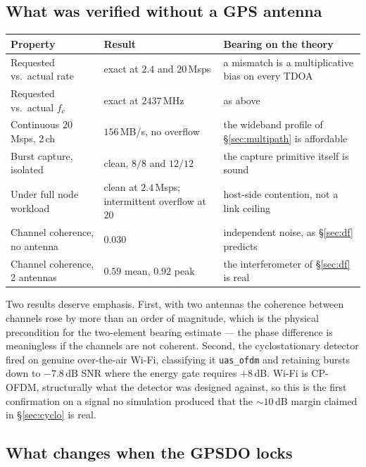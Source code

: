 \documentclass[11pt,a4paper]{article}
\newcommand{\code}[1]{\texttt{\small #1}}
\begin{document}
\subsection{What was verified without a GPS antenna}

\begin{center}
\small
\begin{tabular}{@{}lll@{}}
\toprule
\textbf{Property} & \textbf{Result} & \textbf{Bearing on the theory} \\
\midrule
Requested vs.\ actual rate & exact at $2.4$ and $20$\,Msps &
  a mismatch is a multiplicative bias on every TDOA \\
Requested vs.\ actual $f_c$ & exact at $2437$\,MHz & as above \\
Continuous $20$\,Msps, 2\,ch & $156$\,MB/s, no overflow &
  the wideband profile of \S\ref{sec:multipath} is affordable \\
Burst capture, isolated & clean, $8/8$ and $12/12$ &
  the capture primitive itself is sound \\
Under full node workload & clean at $2.4$\,Msps; intermittent
  overflow at $20$ & host-side contention, not a link ceiling \\
Channel coherence, no antenna & $0.030$ &
  independent noise, as \S\ref{sec:df} predicts \\
Channel coherence, 2 antennas & $0.59$ mean, $0.92$ peak &
  the interferometer of \S\ref{sec:df} is real \\
\bottomrule
\end{tabular}
\end{center}

Two results deserve emphasis. First, with two antennas the coherence between
channels rose by more than an order of magnitude, which is the physical
precondition for the two-element bearing estimate --- the phase difference is
meaningless if the channels are not coherent. Second, the cyclostationary
detector fired on genuine over-the-air Wi-Fi, classifying it \code{uas\_ofdm}
and retaining bursts down to $-7.8$\,dB SNR where the energy gate requires
$+8$\,dB. Wi-Fi is CP-OFDM, structurally what the detector was designed
against, so this is the first confirmation on a signal no simulation produced
that the $\sim\!10$\,dB margin claimed in \S\ref{sec:cyclo} is real.

\subsection{What changes when the GPSDO locks}
\end{document}
